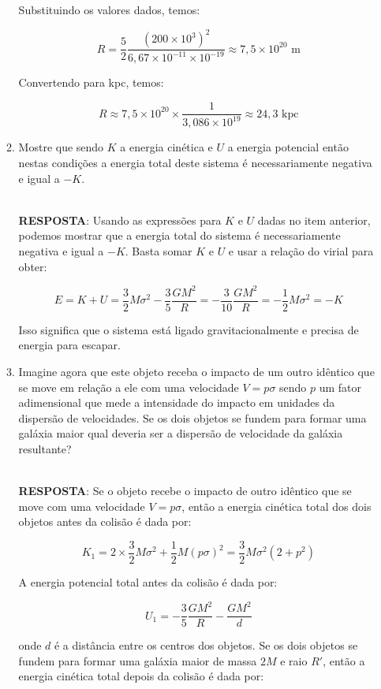 \documentclass[a4paper,12pt]{article}
\begin{document}
\begin{enumerate}
\begin{enumerate}
Substituindo os valores dados, temos:

$$
R = \frac{5}{2}\frac{(200\times 10^3)^2}{6,67\times 10^{-11}\times 10^{-19}} \approx 7,5\times 10^{20} \text{ m}
$$

Convertendo para kpc, temos:

$$
R \approx 7,5\times 10^{20} \times \frac{1}{3,086\times 10^{19}} \approx 24,3 \text{ kpc}
$$

\noindent\hrulefill

\item Mostre que sendo $K$ a energia cinética e $U$ a energia potencial então nestas condições a energia total deste sistema é necessariamente negativa e igual a $-K$.

\noindent\hrulefill\\\textbf{RESPOSTA}: Usando as expressões para $K$ e $U$ dadas no item anterior, podemos mostrar que a energia total do sistema é necessariamente negativa e igual a $-K$. Basta somar $K$ e $U$ e usar a relação do virial para obter:

$$
E = K + U = \frac{3}{2}M\sigma^2 - \frac{3}{5}\frac{GM^2}{R} = -\frac{3}{10}\frac{GM^2}{R} = -\frac{1}{2}M\sigma^2 = -K
$$

Isso significa que o sistema está ligado gravitacionalmente e precisa de energia para escapar.

\noindent\hrulefill

\item Imagine agora que este objeto receba o impacto de um outro idêntico que se move em relação a ele com uma velocidade $V = p\sigma$ sendo $p$ um fator adimensional que mede a intensidade do impacto em unidades da dispersão de velocidades. Se os dois objetos se fundem para formar uma galáxia maior qual deveria ser a dispersão de velocidade da galáxia resultante?

\noindent\hrulefill\\\textbf{RESPOSTA}: Se o objeto recebe o impacto de outro idêntico que se move com uma velocidade $V=p\sigma$, então a energia cinética total dos dois objetos antes da colisão é dada por:

$$
K_1 = 2\times \frac{3}{2}M\sigma^2 + \frac{1}{2}M(p\sigma)^2 = \frac{3}{2}M\sigma^2(2+p^2)
$$

A energia potencial total antes da colisão é dada por:

$$
U_1 = -\frac{3}{5}\frac{GM^2}{R} - \frac{GM^2}{d}
$$

onde $d$ é a distância entre os centros dos objetos. Se os dois objetos se fundem para formar uma galáxia maior de massa $2M$ e raio $R'$, então a energia cinética total depois da colisão é dada por:


\end{enumerate}
\end{enumerate}
\end{document}

